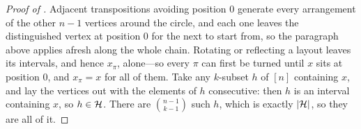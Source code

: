 \begin{proof}[Proof of ]
    Adjacent transpositions avoiding position $0$ generate every arrangement of the other $n - 1$ vertices around the circle, and each one leaves the distinguished vertex at position $0$ for the next to start from, so the paragraph above applies afresh along the whole chain. Rotating or reflecting a layout leaves its intervals, and hence $x_{\pi}$, alone---so every $\pi$ can first be turned until $x$ sits at position $0$, and $x_{\pi} = x$ for all of them. Take any $k$-subset $h$ of $[n]$ containing $x$, and lay the vertices out with the elements of $h$ consecutive: then $h$ is an interval containing $x$, so $h \in \mathcal{H}$. There are $\binom{n-1}{k-1}$ such $h$, which is exactly $\left\lvert \mathcal{H} \right\rvert$, so they are all of it.
\end{proof}